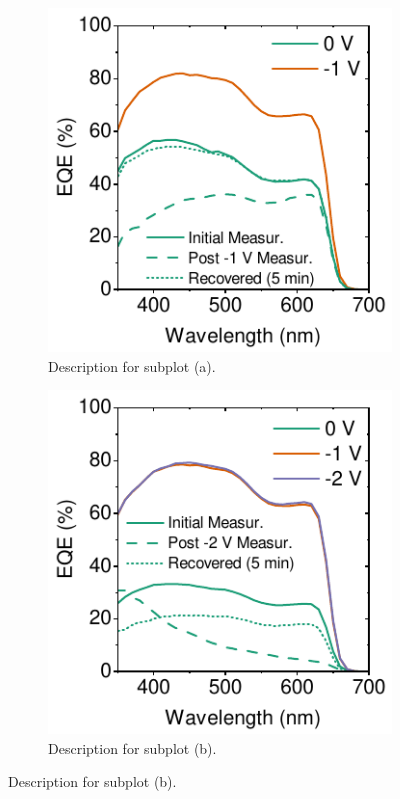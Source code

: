 \begin{figure}[htbp]
    \centering
    \begin{subfigure}[t]{0.45\textwidth} %
        \centering
        \includegraphics[width=\textwidth]{chapters/material_properties/images/EQE-1V.pdf} %
        \caption{Description for subplot (a).}
        \label{fig:ch2:eqe-1V}
    \end{subfigure}
    \hfill %
    \begin{subfigure}[t]{0.45\textwidth} %
        \centering
        \includegraphics[width=\textwidth]{chapters/material_properties/images/EQE-2V.pdf} %
        \caption{Description for subplot (b).}
        \label{fig:ch2:eqe-2V}
    \end{subfigure}


\end{figure}
